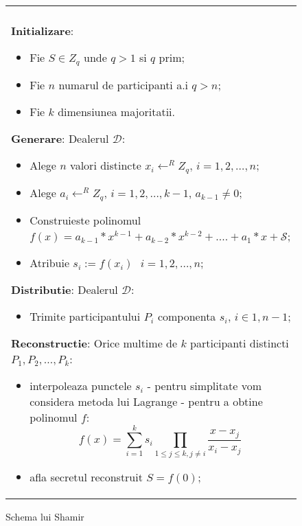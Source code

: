 \documentclass{llncs}
\begin{document}
\begin{figure*}[h!]

\begin{tabular}{|p{\textwidth}|}
\hline

\\
\hspace{.1in}
\textbf{Initializare}: 
	\begin{itemize}
		\item Fie $S \in Z_q$ unde $q > 1 $ si $q$ prim;
		\item Fie $n$ numarul de participanti a.i $q > n$;
		\item Fie $k$ dimensiunea majoritatii.
	\end{itemize}
\medskip

\hspace{.1in}
\textbf{Generare}: Dealerul $\mathcal{D}$:
	\begin{itemize}
		\item Alege $n$ valori distincte $x_i \leftarrow^R Z_q \text{, }i = 1,2,\dots,n$;
		\item Alege $a_{i} \leftarrow^R Z_q \text{, }i = 1,2,\dots,{k - 1}$, $a_{k-1} \neq 0$;
		\item Construieste polinomul $f(x) = a_{k - 1} * x ^ {k-1} + a_{k-2} * x ^ {k - 2} + .... + a_1 * x + \mathcal{S}$;
		\item Atribuie $s_i := f(x_i) \text{ } i = 1,2,\dots,n$;
	\end{itemize}
\medskip

\hspace{.1in}
\textbf{Distributie}: Dealerul $\mathcal{D}$:
	\begin{itemize}
		\item Trimite participantului $P_i$ componenta $s_i$, $i \in {1,n-1}$;
	\end{itemize}

\hspace{.1in}
\textbf{Reconstructie}: Orice multime de $k$ participanti distincti $P_1, P_2, \dots, P_k$:
	\begin{itemize}
		\setlength{\itemsep}{5pt}
		\item interpoleaza punctele $s_i$ - pentru simplitate vom considera metoda lui Lagrange - pentru a obtine polinomul $f$:
		\begin{equation} f(x)=\sum_{i=1}^{k} {s_i}\prod_{1 \leq j \leq k, j \neq i} \frac{x-x_j}{x_i-x_j} \end{equation}
		\item afla secretul reconstruit $S = f(0)$;
	\end{itemize}

\\
\hline
\end{tabular}

\caption{Schema lui Shamir \cite{S:1979}}
\label{fig:shamir_scheme}
\end{figure*}
\end{document}
